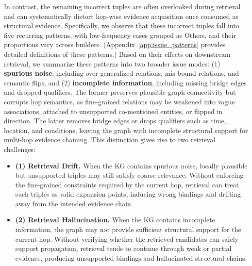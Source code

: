 \documentclass{article}
\theoremstyle{plain}
\theoremstyle{definition}
\theoremstyle{remark}
\begin{document}
In contrast, the remaining incorrect tuples are often overlooked during retrieval and can systematically distort hop-wise evidence acquisition once consumed as structural evidence. Specifically, we observe that these incorrect tuples fall into five recurring patterns, with low-frequency cases grouped as Others, and their proportions vary across builders. (Appendix~\ref{app:issue_patterns} provides detailed definitions of these patterns.) Based on their effects on downstream retrieval, we summarize these patterns into two broader issue modes: (1) \textbf{spurious noise}, including over-generalized relations, mis-bound relations, and semantic flips, and (2) \textbf{incomplete information}, including missing bridge edges and dropped qualifiers. The former preserves plausible graph connectivity but corrupts hop semantics, as fine-grained relations may be weakened into vague associations, attached to unsupported co-mentioned entities, or flipped in direction. The latter removes bridge edges or drops qualifiers such as time, location, and conditions, leaving the graph with incomplete structural support for multi-hop evidence chaining. This distinction gives rise to two retrieval challenges:

\begin{itemize}
\item \textbf{(1) Retrieval Drift.}
When the KG contains spurious noise, locally plausible but unsupported triples may still satisfy coarse relevance. Without enforcing the fine-grained constraints required by the current hop, retrieval can treat such triples as valid expansion points, inducing wrong bindings and drifting away from the intended evidence chain.

\item \textbf{(2) Retrieval Hallucination.}
When the KG contains incomplete information, the graph may not provide sufficient structural support for the current hop. Without verifying whether the retrieved candidates can safely support propagation, retrieval tends to continue through weak or partial evidence, producing unsupported bindings and hallucinated structural chains.
\end{itemize}
\end{document}
